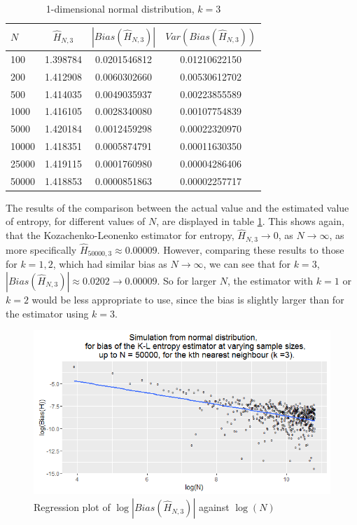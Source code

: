 \documentclass{article}
\begin{document}
\begin{table}
\caption{1-dimensional normal distribution, $k=3$} \label{normal_k=3_table}
\begin{center}
\begin{tabular}{| l | c c c|} 
\toprule
$N$ & $\hat{H}_{N, 3}$ & $|Bias(\hat{H}_{N, 3})|$ & $Var(Bias(\hat{H}_{N, 3}))$ \\
\midrule[1pt]
100     & 1.398784     & 0.0201546812     & 0.01210622150  \\
200     & 1.412908     & 0.0060302660     & 0.00530612702  \\
500     & 1.414035     & 0.0049035937     & 0.00223855589  \\
1000    & 1.416105     & 0.0028340080     & 0.00107754839  \\
5000    & 1.420184     & 0.0012459298     & 0.00022320970  \\
10000   & 1.418351     & 0.0005874791     & 0.00011630350  \\
25000   & 1.419115     & 0.0001760980     & 0.00004286406  \\
50000   & 1.418853     & 0.0000851863     & 0.00002257717  \\
\hline
\end{tabular}
\end{center}
\end{table}

The results of the comparison between the actual value and the estimated value of entropy, for different values of $N$, are displayed in table \ref{normal_k=3_table}. This shows again, that the Kozachenko-Leonenko estimator for entropy, $\hat{H}_{N, 3} \to 0$, as $N \to \infty$, as more specifically $\hat{H}_{50000, 3} \approx 0.00009$. However, comparing these results to those for $k=1, 2$, which had similar bias as $N \to \infty$, we can see that for $k=3$, $|Bias(\hat{H}_{N, 3})| \approx 0.0202 \to 0.00009$. So for larger $N$, the estimator with $k=1$ or $k=2$ would be less appropriate to use, since the bias is slightly larger than for the estimator using $k=3$.

\begin{figure}
  \begin{center}
    \includegraphics[width=\textwidth]{./Graphs/Normal_k=3_plot.png}
  \end{center}
\caption{Regression plot of $\log|Bias(\hat{H}_{N, 3})|$ against $\log(N)$}
  \label{normal_k=3_graph}
\end{figure}
\end{document}
